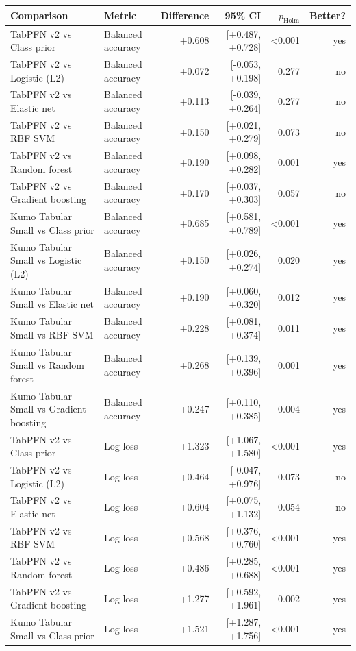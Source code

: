 \begin{tabular}{llrrrr}
\toprule
Comparison & Metric & Difference & 95\% CI & $p_{\mathrm{Holm}}$ & Better? \\
\midrule
TabPFN v2 vs Class prior & Balanced accuracy & +0.608 & [+0.487, +0.728] & <0.001 & yes \\
TabPFN v2 vs Logistic (L2) & Balanced accuracy & +0.072 & [-0.053, +0.198] & 0.277 & no \\
TabPFN v2 vs Elastic net & Balanced accuracy & +0.113 & [-0.039, +0.264] & 0.277 & no \\
TabPFN v2 vs RBF SVM & Balanced accuracy & +0.150 & [+0.021, +0.279] & 0.073 & no \\
TabPFN v2 vs Random forest & Balanced accuracy & +0.190 & [+0.098, +0.282] & 0.001 & yes \\
TabPFN v2 vs Gradient boosting & Balanced accuracy & +0.170 & [+0.037, +0.303] & 0.057 & no \\
\addlinespace
Kumo Tabular Small vs Class prior & Balanced accuracy & +0.685 & [+0.581, +0.789] & <0.001 & yes \\
Kumo Tabular Small vs Logistic (L2) & Balanced accuracy & +0.150 & [+0.026, +0.274] & 0.020 & yes \\
Kumo Tabular Small vs Elastic net & Balanced accuracy & +0.190 & [+0.060, +0.320] & 0.012 & yes \\
Kumo Tabular Small vs RBF SVM & Balanced accuracy & +0.228 & [+0.081, +0.374] & 0.011 & yes \\
Kumo Tabular Small vs Random forest & Balanced accuracy & +0.268 & [+0.139, +0.396] & 0.001 & yes \\
Kumo Tabular Small vs Gradient boosting & Balanced accuracy & +0.247 & [+0.110, +0.385] & 0.004 & yes \\
\addlinespace
TabPFN v2 vs Class prior & Log loss & +1.323 & [+1.067, +1.580] & <0.001 & yes \\
TabPFN v2 vs Logistic (L2) & Log loss & +0.464 & [-0.047, +0.976] & 0.073 & no \\
TabPFN v2 vs Elastic net & Log loss & +0.604 & [+0.075, +1.132] & 0.054 & no \\
TabPFN v2 vs RBF SVM & Log loss & +0.568 & [+0.376, +0.760] & <0.001 & yes \\
TabPFN v2 vs Random forest & Log loss & +0.486 & [+0.285, +0.688] & <0.001 & yes \\
TabPFN v2 vs Gradient boosting & Log loss & +1.277 & [+0.592, +1.961] & 0.002 & yes \\
\addlinespace
Kumo Tabular Small vs Class prior & Log loss & +1.521 & [+1.287, +1.756] & <0.001 & yes \\

\end{tabular}
